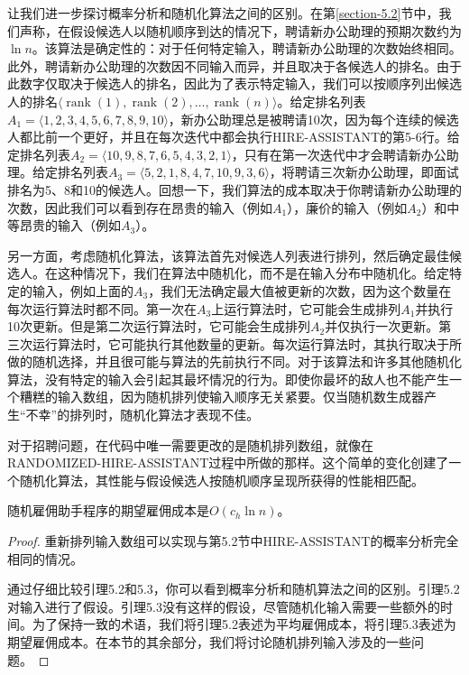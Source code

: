 \documentclass[lang=cn,newtx,10pt,scheme=chinese]{elegantbook}
\begin{document}
让我们进一步探讨概率分析和随机化算法之间的区别。在第\ref{section-5.2}节中，我们声称，在假设候选人以随机顺序到达的情况下，聘请新办公助理的预期次数约为$\ln n$。该算法是确定性的：对于任何特定输入，聘请新办公助理的次数始终相同。此外，聘请新办公助理的次数因不同输入而异，并且取决于各候选人的排名。由于此数字仅取决于候选人的排名，因此为了表示特定输入，我们可以按顺序列出候选人的排名$\langle\operatorname{rank}(1),\operatorname{rank}(2),\ldots,\operatorname{rank}(n)\rangle$。给定排名列表$A_1=\langle 1,2,3,4,5,6,7,8,9,10\rangle$，新办公助理总是被聘请10次，因为每个连续的候选人都比前一个更好，并且在每次迭代中都会执行HIRE-ASSISTANT的第5-6行。给定排名列表$A_2=\langle 10,9,8,7,6,5,4,3,2,1\rangle$，只有在第一次迭代中才会聘请新办公助理。给定排名列表$A_3=\langle 5,2,1,8,4,7,10,9,3,6\rangle$，将聘请三次新办公助理，即面试排名为5、8和10的候选人。回想一下，我们算法的成本取决于你聘请新办公助理的次数，因此我们可以看到存在昂贵的输入（例如$A_1$），廉价的输入（例如$A_2$）和中等昂贵的输入（例如$A_3$）。

另一方面，考虑随机化算法，该算法首先对候选人列表进行排列，然后确定最佳候选人。在这种情况下，我们在算法中随机化，而不是在输入分布中随机化。给定特定的输入，例如上面的$A_3$，我们无法确定最大值被更新的次数，因为这个数量在每次运行算法时都不同。第一次在$A_3$上运行算法时，它可能会生成排列$A_1$并执行10次更新。但是第二次运行算法时，它可能会生成排列$A_2$并仅执行一次更新。第三次运行算法时，它可能执行其他数量的更新。每次运行算法时，其执行取决于所做的随机选择，并且很可能与算法的先前执行不同。对于该算法和许多其他随机化算法，没有特定的输入会引起其最坏情况的行为。即使你最坏的敌人也不能产生一个糟糕的输入数组，因为随机排列使输入顺序无关紧要。仅当随机数生成器产生“不幸”的排列时，随机化算法才表现不佳。

对于招聘问题，在代码中唯一需要更改的是随机排列数组，就像在RANDOMIZED-HIRE-ASSISTANT过程中所做的那样。这个简单的变化创建了一个随机化算法，其性能与假设候选人按随机顺序呈现所获得的性能相匹配。

\begin{lemma}{}{}
随机雇佣助手程序的期望雇佣成本是$O\left(c_h \ln n\right)$。
\end{lemma}

\begin{proof}
重新排列输入数组可以实现与第5.2节中HIRE-ASSISTANT的概率分析完全相同的情况。

通过仔细比较引理5.2和5.3，你可以看到概率分析和随机算法之间的区别。引理5.2对输入进行了假设。引理5.3没有这样的假设，尽管随机化输入需要一些额外的时间。为了保持一致的术语，我们将引理5.2表述为平均雇佣成本，将引理5.3表述为期望雇佣成本。在本节的其余部分，我们将讨论随机排列输入涉及的一些问题。
\end{proof}
\end{document}
